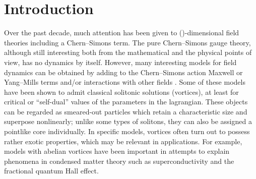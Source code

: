\documentclass[a4paper,11pt]{article}
\begin{document}
\section{Introduction}


Over the past decade, much attention has been given to 
(\coordHE{})-dimensional field theories including a Chern--Simons term. 
The pure Chern--Simons gauge theory, although still interesting 
both from the mathematical and the physical points of view, has no 
dynamics by itself. However, many interesting models for field dynamics 
can be obtained by adding to the Chern--Simons action 
Maxwell or Yang--Mills terms and/or 
interactions with other fields \cite{Du}. Some of these models have
been shown to admit classical solitonic solutions (vortices), at least
for critical or ``self-dual'' values of the parameters in the lagrangian.
These objects can be regarded as smeared-out particles which retain a
characteristic size and superpose nonlinearly;
unlike some types of solitons, they can also be assigned a pointlike
core individually. 
In specific models, vortices often turn out to possess
rather exotic properties, which may be relevant in applications.
For example, models with abelian vortices have been important in
attempts to explain phenomena in condensed matter theory such as 
superconductivity and the fractional quantum Hall effect. 
\end{document}
